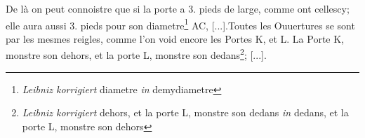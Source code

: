 \pend \newpage \pstart [p.~93] [...] De l\`{a} on peut connoistre que si la porte a 3. pieds de large, comme ont celles\textendash cy; elle aura aussi 3. pieds pour son diametre\footnote{\textit{Leibniz korrigiert} diametre \textit{in} demydiametre} AC, [...].\pend \pstart  Toutes les Ouuertures se sont par les mesmes reigles, comme l'on void encore les Portes K, et L. La Porte K, monstre son dehors, et la porte L, monstre son dedans\footnote{\textit{Leibniz korrigiert} dehors, et la porte L, monstre son dedans \textit{in} dedans, et la porte L, monstre son dehors}; [...].